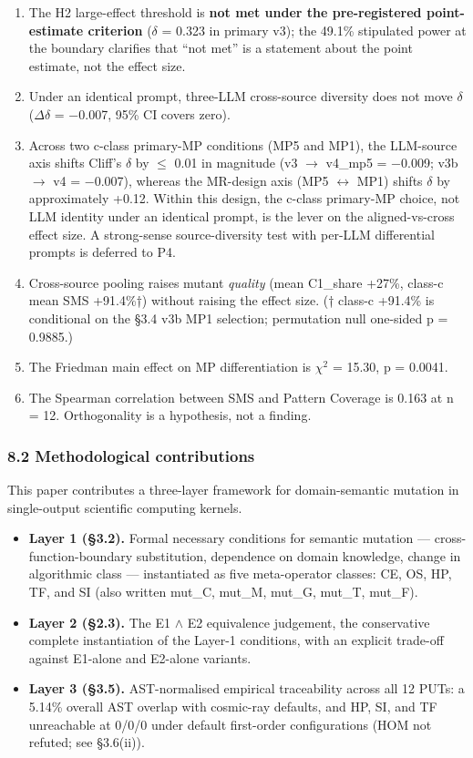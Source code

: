 \documentclass[review,12pt,authoryear]{elsarticle}
\providecommand{\tightlist}{\setlength{\itemsep}{0pt}\setlength{\parskip}{0pt}}
\begin{document}
\begin{enumerate}
\def\labelenumi{(\roman{enumi})}
\item
  The H2 large-effect threshold is \textbf{not met under the
  pre-registered point-estimate criterion} ($\delta$ = 0.323 in primary v3);
  the 49.1\% stipulated power at the boundary clarifies that ``not met''
  is a statement about the point estimate, not the effect size.
\item
  Under an identical prompt, three-LLM cross-source diversity does not
  move $\delta$ ($\Delta$$\delta$ = −0.007, 95\% CI covers zero).
\item
  Across two c-class primary-MP conditions (MP5 and MP1), the LLM-source
  axis shifts Cliff's $\delta$ by $\leq$ 0.01 in magnitude (v3 $\to$ v4\_mp5 = −0.009;
  v3b $\to$ v4 = −0.007), whereas the MR-design axis (MP5 $\leftrightarrow$ MP1) shifts $\delta$ by
  approximately +0.12. Within this design, the c-class primary-MP
  choice, not LLM identity under an identical prompt, is the lever on
  the aligned-vs-cross effect size. A strong-sense source-diversity test
  with per-LLM differential prompts is deferred to P4.
\item
  Cross-source pooling raises mutant \emph{quality} (mean C1\_share
  +27\%, class-c mean SMS +91.4\%†) without raising the effect size. (†
  class-c +91.4\% is conditional on the §3.4 v3b MP1 selection;
  permutation null one-sided p = 0.9885.)
\item
  The Friedman main effect on MP differentiation is $\chi$$^{2}$ = 15.30, p =
  0.0041.
\item
  The Spearman correlation between SMS and Pattern Coverage is 0.163 at
  n = 12. Orthogonality is a hypothesis, not a finding.
\end{enumerate}

\subsubsection{8.2 Methodological
contributions}\label{methodological-contributions}

This paper contributes a three-layer framework for domain-semantic
mutation in single-output scientific computing kernels.

\begin{itemize}
\tightlist
\item
  \textbf{Layer 1 (§3.2).} Formal necessary conditions for semantic
  mutation --- cross-function-boundary substitution, dependence on
  domain knowledge, change in algorithmic class --- instantiated as five
  meta-operator classes: CE, OS, HP, TF, and SI (also written mut\_C,
  mut\_M, mut\_G, mut\_T, mut\_F).
\item
  \textbf{Layer 2 (§2.3).} The E1 $\wedge$ E2 equivalence judgement, the
  conservative complete instantiation of the Layer-1 conditions, with an
  explicit trade-off against E1-alone and E2-alone variants.
\item
  \textbf{Layer 3 (§3.5).} AST-normalised empirical traceability across
  all 12 PUTs: a 5.14\% overall AST overlap with cosmic-ray defaults,
  and HP, SI, and TF unreachable at 0/0/0 under default first-order
  configurations (HOM not refuted; see §3.6(ii)).
\end{itemize}
\end{document}
